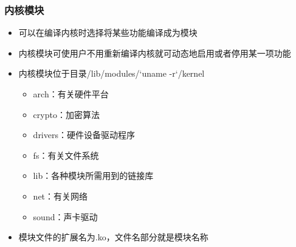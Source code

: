 \documentclass[xcolor=svgnames,presentation]{beamer}
\begin{document}
\begin{frame}
\frametitle{内核模块}
\label{sec-2-3}
\begin{itemize}

\item 可以在编译内核时选择将某些功能编译成为模块
\label{sec-2-3-1}%

\item 内核模块可使用户不用重新编译内核就可动态地启用或者停用某一项功能
\label{sec-2-3-2}%

\item 内核模块位于目录/lib/modules/`uname -r`/kernel
\label{sec-2-3-3}%
\begin{itemize}

\item arch：有关硬件平台
\label{sec-2-3-3-1}%

\item crypto：加密算法
\label{sec-2-3-3-2}%

\item drivers：硬件设备驱动程序
\label{sec-2-3-3-3}%

\item fs：有关文件系统
\label{sec-2-3-3-4}%

\item lib：各种模块所需用到的链接库
\label{sec-2-3-3-5}%

\item net：有关网络
\label{sec-2-3-3-6}%

\item sound：声卡驱动
\label{sec-2-3-3-7}%
\end{itemize} %

\item 模块文件的扩展名为.ko，文件名部分就是模块名称
\label{sec-2-3-4}%
\end{itemize} %
\end{frame}
\end{document}
